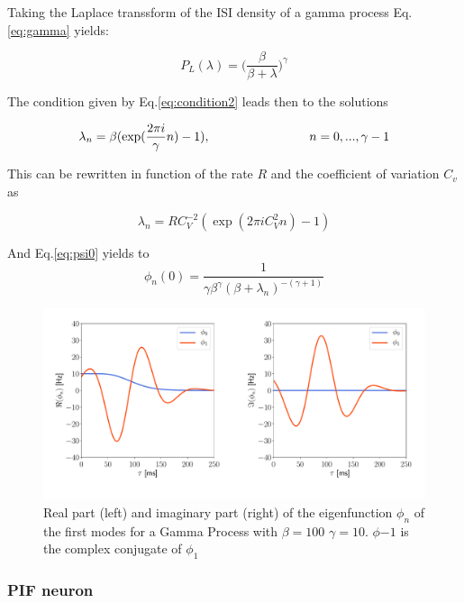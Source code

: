 \documentclass[12pt,twoside]{report}
\begin{document}
Taking the Laplace transsform of the ISI density of a gamma process Eq. \eqref{eq:gamma} yields:

\begin{equation}
P_L(\lambda)=\big(\frac{\beta}{\beta +\lambda}\big)^\gamma
\end{equation}


The condition given by Eq.\eqref{eq:condition2} leads then to the solutions


\begin{equation}
\lambda_n=\beta(\exp(\frac{2\pi i}{\gamma}n)-1), \hspace{2.8cm}  n=0,..., \gamma-1
\end{equation}

This can be rewritten in function of the rate $R$ and the coefficient of variation $C_v$ as

\begin{equation}
\lambda_n=RC_V^{-2}(\exp(2\pi iC_V^2 n)-1)
\end{equation}

And Eq.\ref{eq:psi0} yields to
\begin{equation}
\phi_n(0)=\frac{1}{\gamma\beta^\gamma(\beta+\lambda_n)^{-(\gamma+1)}}
\end{equation}


\begin{figure}[h!]
	\centering
	\includegraphics[width=0.8\linewidth]{gamma_eigenfunction.pdf}
	\caption{Real part (left) and imaginary part (right) of the eigenfunction $\phi_n$ of the first modes for a Gamma Process with $\beta=100$
		$\gamma=10$. $\phi{-1}$ is the complex conjugate of  $\phi_{1}$}
	\label{fig:gammaeigenfunction}
\end{figure}



\subsubsection{PIF neuron}
\end{document}
